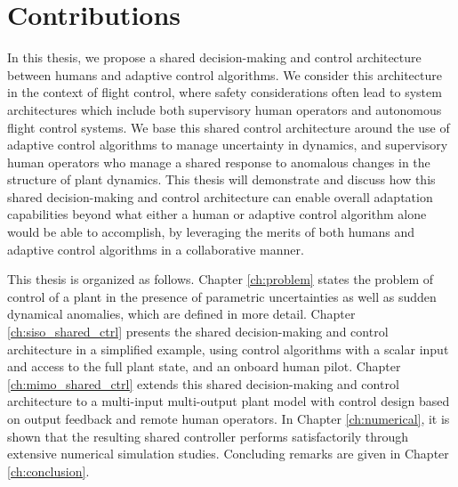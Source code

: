 \section{Contributions}

In this thesis, we propose a shared decision-making and control architecture between humans and adaptive control algorithms. We consider this architecture in the context of flight control, where safety considerations often lead to system architectures which include both supervisory human operators and autonomous flight control systems. We base this shared control architecture around the use of adaptive control algorithms to manage uncertainty in dynamics, and supervisory human operators who manage a shared response to anomalous changes in the structure of plant dynamics. This thesis will demonstrate and discuss how this shared decision-making and control architecture can enable overall adaptation capabilities beyond what either a human or adaptive control algorithm alone would be able to accomplish, by leveraging the merits of both humans and adaptive control algorithms in a collaborative manner. 

This thesis is organized as follows. Chapter \ref{ch:problem} states the problem of control of a plant in the presence of parametric uncertainties as well as sudden dynamical anomalies, which are defined in more detail. Chapter \ref{ch:siso_shared_ctrl} presents the shared decision-making and control architecture in a simplified example, using control algorithms with a scalar input and access to the full plant state, and an onboard human pilot. Chapter \ref{ch:mimo_shared_ctrl} extends this shared decision-making and control architecture to a multi-input multi-output plant model with control design based on output feedback and remote human operators. In Chapter \ref{ch:numerical}, it is shown that the resulting shared controller performs satisfactorily through extensive numerical simulation studies. Concluding remarks are given in Chapter \ref{ch:conclusion}.

